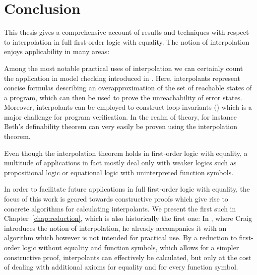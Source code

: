 \chapter{Conclusion}

This thesis gives a comprehensive account of results and techniques with respect to interpolation in full first-order logic with equality.
The notion of interpolation enjoys applicability in many areas:

Among the most notable practical uses of interpolation we can certainly count the application in model checking introduced in \cite{McMillan03}.
Here, interpolants represent concise formulas describing an overapproximation of the set of reachable states of a program, which can then be used to prove the unreachability of error states.
Moreover, interpolants can be employed to construct loop invariants (\cite{weissenbacher2010}) which is a major challenge for program verification.
In the realm of theory, for instance Beth's definability theorem can very easily be proven using the interpolation theorem.

Even though the interpolation theorem holds in first-order logic with equality, %
a multitude of applications in fact mostly deal only with weaker logics such as propositional logic or equational logic with uninterpreted function symbols.

In order to facilitate future applications in full first-order logic with equality, the focus of this work is geared towards constructive proofs which give rise to concrete algorithms for calculating interpolants.
We present the first such in Chapter~\ref{chap:reduction}, which is also historically the first one:
In \cite{Craig57linear,Craig57three}, where Craig introduces the notion of interpolation, he already accompanies it with an algorithm which however is not intended for practical use.
By a reduction to first-order logic without equality and function symbols, which allows for a simpler constructive proof, interpolants can effectively be calculated, but only at the cost of dealing with additional axioms for equality and for every function symbol.

